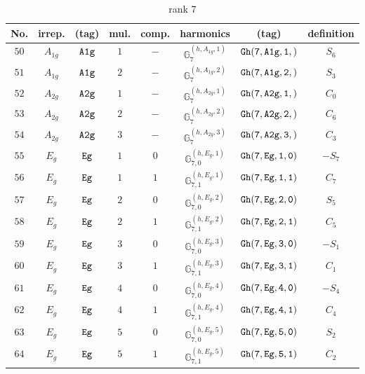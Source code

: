 \documentclass[fleqn,8pt]{jsarticle}
\begin{document}
\begin{table}[ht!]
\begin{center}
\caption{rank 7}
\renewcommand{\arraystretch}{1.3}
\begin{tabular}{cccccccc} \hline \hline
No. & irrep. & (tag) & mul. & comp. & harmonics & (tag) & definition \\ \hline
$ 50 $ & $ A_{1g} $ & $ {\tt A1g} $ & $ 1 $ & $ - $ & $ \mathbb{G}_{7}^{(h,A_{1g},1)} $ & $ {\tt Gh(7,A1g,1,)} $ & $ S_{6} $ \\
$ 51 $ & $ A_{1g} $ & $ {\tt A1g} $ & $ 2 $ & $ - $ & $ \mathbb{G}_{7}^{(h,A_{1g},2)} $ & $ {\tt Gh(7,A1g,2,)} $ & $ S_{3} $ \\
$ 52 $ & $ A_{2g} $ & $ {\tt A2g} $ & $ 1 $ & $ - $ & $ \mathbb{G}_{7}^{(h,A_{2g},1)} $ & $ {\tt Gh(7,A2g,1,)} $ & $ C_{0} $ \\
$ 53 $ & $ A_{2g} $ & $ {\tt A2g} $ & $ 2 $ & $ - $ & $ \mathbb{G}_{7}^{(h,A_{2g},2)} $ & $ {\tt Gh(7,A2g,2,)} $ & $ C_{6} $ \\
$ 54 $ & $ A_{2g} $ & $ {\tt A2g} $ & $ 3 $ & $ - $ & $ \mathbb{G}_{7}^{(h,A_{2g},3)} $ & $ {\tt Gh(7,A2g,3,)} $ & $ C_{3} $ \\
$ 55 $ & $ E_{g} $ & $ {\tt Eg} $ & $ 1 $ & $ 0 $ & $ \mathbb{G}_{7,0}^{(h,E_{g},1)} $ & $ {\tt Gh(7,Eg,1,0)} $ & $ - S_{7} $ \\
$ 56 $ & $ E_{g} $ & $ {\tt Eg} $ & $ 1 $ & $ 1 $ & $ \mathbb{G}_{7,1}^{(h,E_{g},1)} $ & $ {\tt Gh(7,Eg,1,1)} $ & $ C_{7} $ \\
$ 57 $ & $ E_{g} $ & $ {\tt Eg} $ & $ 2 $ & $ 0 $ & $ \mathbb{G}_{7,0}^{(h,E_{g},2)} $ & $ {\tt Gh(7,Eg,2,0)} $ & $ S_{5} $ \\
$ 58 $ & $ E_{g} $ & $ {\tt Eg} $ & $ 2 $ & $ 1 $ & $ \mathbb{G}_{7,1}^{(h,E_{g},2)} $ & $ {\tt Gh(7,Eg,2,1)} $ & $ C_{5} $ \\
$ 59 $ & $ E_{g} $ & $ {\tt Eg} $ & $ 3 $ & $ 0 $ & $ \mathbb{G}_{7,0}^{(h,E_{g},3)} $ & $ {\tt Gh(7,Eg,3,0)} $ & $ - S_{1} $ \\
$ 60 $ & $ E_{g} $ & $ {\tt Eg} $ & $ 3 $ & $ 1 $ & $ \mathbb{G}_{7,1}^{(h,E_{g},3)} $ & $ {\tt Gh(7,Eg,3,1)} $ & $ C_{1} $ \\
$ 61 $ & $ E_{g} $ & $ {\tt Eg} $ & $ 4 $ & $ 0 $ & $ \mathbb{G}_{7,0}^{(h,E_{g},4)} $ & $ {\tt Gh(7,Eg,4,0)} $ & $ - S_{4} $ \\
$ 62 $ & $ E_{g} $ & $ {\tt Eg} $ & $ 4 $ & $ 1 $ & $ \mathbb{G}_{7,1}^{(h,E_{g},4)} $ & $ {\tt Gh(7,Eg,4,1)} $ & $ C_{4} $ \\
$ 63 $ & $ E_{g} $ & $ {\tt Eg} $ & $ 5 $ & $ 0 $ & $ \mathbb{G}_{7,0}^{(h,E_{g},5)} $ & $ {\tt Gh(7,Eg,5,0)} $ & $ S_{2} $ \\
$ 64 $ & $ E_{g} $ & $ {\tt Eg} $ & $ 5 $ & $ 1 $ & $ \mathbb{G}_{7,1}^{(h,E_{g},5)} $ & $ {\tt Gh(7,Eg,5,1)} $ & $ C_{2} $ \\
 \hline \hline
\end{tabular}
\end{center}
\end{table}
\end{document}
